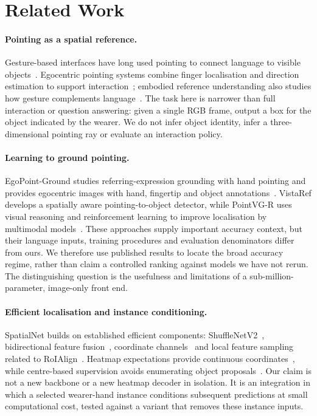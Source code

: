 ﻿\section{Related Work}
\paragraph{Pointing as a spatial reference.}
Gesture-based interfaces have long used pointing to connect language to visible objects~\cite{bolt1980put}. Egocentric pointing systems combine finger localisation and direction estimation to support interaction~\cite{huang2016pointing,jain2019gestarlite}; embodied reference understanding also studies how gesture complements language~\cite{chen2021yourefit}. The task here is narrower than full interaction or question answering: given a single RGB frame, output a box for the object indicated by the wearer. We do not infer object identity, infer a three-dimensional pointing ray or evaluate an interaction policy.

\paragraph{Learning to ground pointing.}
EgoPoint-Ground studies referring-expression grounding with hand pointing and provides egocentric images with hand, fingertip and object annotations~\cite{egopoint}. VistaRef develops a spatially aware pointing-to-object detector, while PointVG-R uses visual reasoning and reinforcement learning to improve localisation by multimodal models~\cite{li2026vistaref,li2026pointvgr}. These approaches supply important accuracy context, but their language inputs, training procedures and evaluation denominators differ from ours. We therefore use published results to locate the broad accuracy regime, rather than claim a controlled ranking against models we have not rerun. The distinguishing question is the usefulness and limitations of a sub-million-parameter, image-only front end.

\paragraph{Efficient localisation and instance conditioning.}
SpatialNet builds on established efficient components: ShuffleNetV2~\cite{ma2018shufflenet}, bidirectional feature fusion~\cite{tan2020efficientdet}, coordinate channels~\cite{liu2018coordconv} and local feature sampling related to RoIAlign~\cite{he2017mask}. Heatmap expectations provide continuous coordinates~\cite{sun2018integral}, while centre-based supervision avoids enumerating object proposals~\cite{zhou2019objects}. Our claim is not a new backbone or a new heatmap decoder in isolation. It is an integration in which a selected wearer-hand instance conditions subsequent predictions at small computational cost, tested against a variant that removes these instance inputs.

